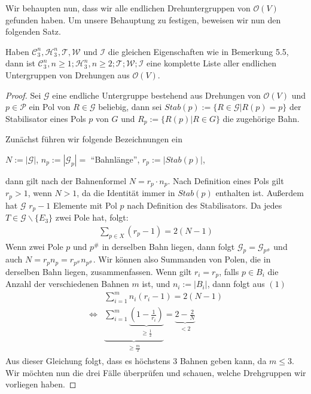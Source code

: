 Wir behaupten nun, dass wir alle endlichen Drehuntergruppen von $\mathcal{O}(V)$ gefunden haben. Um unsere Behauptung zu festigen, beweisen wir nun den folgenden Satz.
\begin{theorem}
	Haben $\mathcal{C}^n_3,\mathcal{H}^n_3,\mathcal{T},\mathcal{W}$ und $\mathcal{I}$ die gleichen Eigenschaften wie in Bemerkung 5.5, dann ist $\mathcal{C}^n_3,n\geq1;\mathcal{H}^n_3,n\geq2;\mathcal{T};\mathcal{W};\mathcal{I}$ eine komplette Liste aller endlichen Untergruppen von Drehungen aus $\mathcal{O}(V)$.
\end{theorem}
\begin{proof}
	Sei $\mathcal{G}$ eine endliche Untergruppe bestehend aus Drehungen von $\mathcal{O}(V)$ und $p \in \mathcal{P}$ ein Pol von $R \in \mathcal{G}$ beliebig, dann sei $Stab(p) := \{R\in \mathcal{G} | R(p)=p\}$ der Stabilisator eines Pols $p$ von $G$ und $R_p := \{R(p) | R \in G \}$ die zugehörige Bahn.

	Zunächst führen wir folgende Bezeichnungen ein
	\begin{center}
		$N:=|\mathcal{G}|$, $n_p:=|\mathcal{G}_p|=$ "`Bahnlänge"', $r_p:=|Stab(p)|$,
	\end{center}
	dann gilt nach der Bahnenformel $N=r_p \cdot n_p$. Nach Definition eines Pols gilt $r_p > 1$, wenn $N > 1$, da die Identität immer in $Stab(p)$ enthalten ist. Außerdem hat $\mathcal{G}$ $r_p - 1$ Elemente mit Pol $p$ nach Definition des Stabilisators. Da jedes $T \in \mathcal{G}\backslash\{E_3\}$ zwei Pole hat, folgt:
	\setcounter{equation}{0}
	\begin{align}
	\sum_{p \in X}(r_p - 1)= 2(N-1)
	\end{align}
	Wenn zwei Pole $p$ und $p^{\#}$ in derselben Bahn liegen, dann folgt $\mathcal{G}_p=\mathcal{G}_{p^{\#}}$ und auch $N=r_p n_p=r_{p^{\#}} n_{p^{\#}}$. Wir können also Summanden von Polen, die in derselben Bahn liegen, zusammenfassen. Wenn gilt $r_i=r_p$, falls $p\in B_i$ die Anzahl der verschiedenen Bahnen $m$ ist, und $n_i:=|B_i|$, dann folgt aus $(1)$
	\begin{align}
	&\sum_{i=1}^m n_i(r_i-1)=2(N-1) \\
	\Leftrightarrow &\underbrace{\sum_{i=1}^m \underbrace{(1-\frac{1}{r_i})}_{\substack{\geq \frac{1}{2}}}}_{\substack{\geq \frac{m}{2}}}=\underbrace{2-\frac{2}{N}}_{\substack{<2}}
	\end{align}
	Aus dieser Gleichung folgt, dass es höchstens 3 Bahnen geben kann, da $m \leq 3$. Wir möchten nun die drei Fälle überprüfen und schauen, welche Drehgruppen wir vorliegen haben.


\end{proof}
